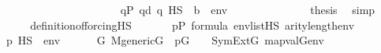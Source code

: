 \begin{isabellebody}
\ \ \ \ \ \ \ \ \isamarkupfalse%
\isanewline
\ \ \ \ \ \ \isamarkupfalse%
\ \isanewline
\ \ \ \ \ \ \isamarkupfalse%
\ {\isacartoucheopen}{\isasymforall}q{\isasymin}P{\isachardot}{\kern0pt}\ q{\isasympreceq}d\ {\isasymlongrightarrow}{\isasymnot}{\isacharparenleft}{\kern0pt}q\ {\isasymtturnstile}HS\ {\isasymphi}\ {\isacharparenleft}{\kern0pt}{\isacharbrackleft}{\kern0pt}b{\isacharbrackright}{\kern0pt}\ {\isacharat}{\kern0pt}\ env{\isacharparenright}{\kern0pt}{\isacharparenright}{\kern0pt}{\isacartoucheclose}\isanewline
\ \ \ \ \ \ \isamarkupfalse%
\isanewline
\ \ \ \ \ \ \isamarkupfalse%
\ {\isacharquery}{\kern0pt}thesis\ \isamarkupfalse%
\ simp\isanewline
\ \ \ \ \isamarkupfalse%
\isanewline
\ \ \isamarkupfalse%
\isanewline
{}\isamarkupfalse%
%
\endisatagproof
{\isafoldproof}%
%
\isadelimproof
\isanewline
%
\endisadelimproof
\isanewline
{}\isamarkupfalse%
\ definition{\isacharunderscore}{\kern0pt}of{\isacharunderscore}{\kern0pt}forcing{\isacharunderscore}{\kern0pt}HS{\isacharcolon}{\kern0pt}\isanewline
\ \ \isanewline
\ \ \ \ {\isachardoublequoteopen}p{\isasymin}P{\isachardoublequoteclose}\ {\isachardoublequoteopen}{\isasymphi}{\isasymin}formula{\isachardoublequoteclose}\ {\isachardoublequoteopen}env{\isasymin}list{\isacharparenleft}{\kern0pt}HS{\isacharparenright}{\kern0pt}{\isachardoublequoteclose}\ {\isachardoublequoteopen}arity{\isacharparenleft}{\kern0pt}{\isasymphi}{\isacharparenright}{\kern0pt}{\isasymle}length{\isacharparenleft}{\kern0pt}env{\isacharparenright}{\kern0pt}{\isachardoublequoteclose}\isanewline
\ \ \isanewline
\ \ \ \ {\isachardoublequoteopen}{\isacharparenleft}{\kern0pt}p\ {\isasymtturnstile}HS\ {\isasymphi}\ env{\isacharparenright}{\kern0pt}\ {\isasymlongleftrightarrow}\isanewline
\ \ \ \ \ {\isacharparenleft}{\kern0pt}{\isasymforall}G{\isachardot}{\kern0pt}\ M{\isacharunderscore}{\kern0pt}generic{\isacharparenleft}{\kern0pt}G{\isacharparenright}{\kern0pt}\ {\isasymand}\ p{\isasymin}G\ \ {\isasymlongrightarrow}\ \ SymExt{\isacharparenleft}{\kern0pt}G{\isacharparenright}{\kern0pt}{\isacharcomma}{\kern0pt}\ map{\isacharparenleft}{\kern0pt}val{\isacharparenleft}{\kern0pt}G{\isacharparenright}{\kern0pt}{\isacharcomma}{\kern0pt}env{\isacharparenright}{\kern0pt}\ {\isasymTurnstile}\ {\isasymphi}{\isacharparenright}{\kern0pt}{\isachardoublequoteclose}\isanewline
%
\isadelimproof
%
\endisadelimproof
%
\isatagproof
{}\isamarkupfalse%

\end{isabellebody}
